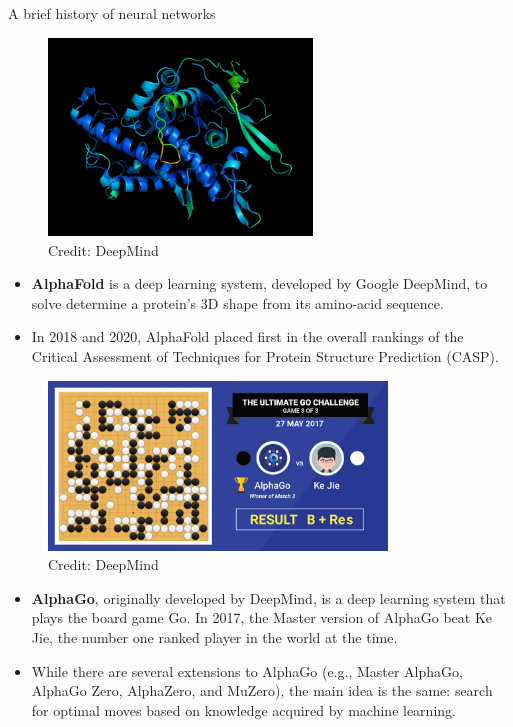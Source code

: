 \begin{vbframe}{A brief history of neural networks}
\begin{figure}
\centering
\includegraphics[width=7cm]{figure/alphafold.jpg}
\\
\tiny {Credit: DeepMind}
\end{figure}
\footnotesize
\begin{itemize}
\item\textbf{AlphaFold} is a deep learning system, developed by Google DeepMind, to solve determine a protein's 3D shape from its amino-acid sequence.
\vspace{.1cm}
\item In 2018 and 2020, AlphaFold placed first in the overall rankings of the Critical Assessment of Techniques for Protein Structure Prediction (CASP).
\end{itemize}
\framebreak
\begin{figure}
\centering
\includegraphics[width=9cm]{figure/alphago.png}
\\
\tiny {Credit: DeepMind}
\end{figure}
\footnotesize
\begin{itemize}
\item\textbf{AlphaGo}, originally developed by DeepMind, is a deep learning system that plays the board game Go. In 2017, the Master version of AlphaGo beat Ke Jie, the number one ranked player in the world at the time.
\vspace{.1cm}
\item While there are several extensions to AlphaGo (e.g., Master AlphaGo, AlphaGo Zero, AlphaZero, and MuZero), the main idea is the same: search for optimal moves based on knowledge acquired by machine learning.
\end{itemize}
\framebreak


\end{vbframe}
